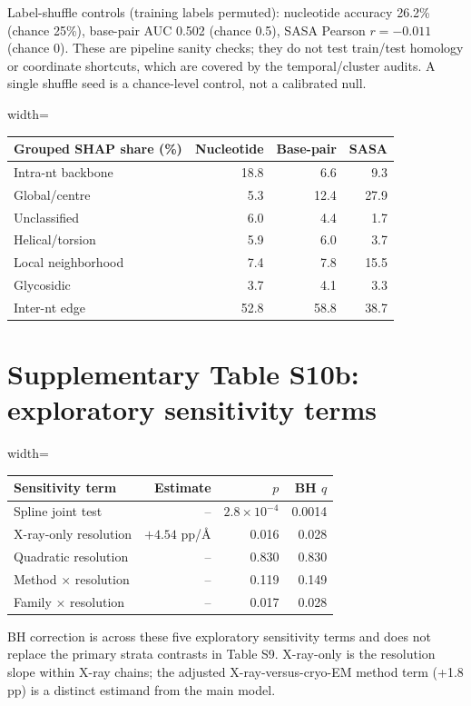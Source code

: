 \documentclass[pdflatex,sn-nature]{sn-jnl}
\begin{document}
Label-shuffle controls (training labels permuted): nucleotide accuracy 26.2\% (chance
25\%), base-pair AUC 0.502 (chance 0.5), SASA Pearson $r=-0.011$ (chance 0). These are pipeline sanity checks; they do not test train/test homology or coordinate shortcuts, which are covered by the temporal/cluster audits. A single shuffle seed is a chance-level control, not a calibrated null.

\begingroup\scriptsize
\begin{adjustbox}{width=\textwidth}
\begin{tabular}{lrrr}
\toprule
Grouped SHAP share (\%) & Nucleotide & Base-pair & SASA \\
\midrule
Intra-nt backbone & 18.8 & 6.6 & 9.3 \\
Global/centre & 5.3 & 12.4 & 27.9 \\
Unclassified & 6.0 & 4.4 & 1.7 \\
Helical/torsion & 5.9 & 6.0 & 3.7 \\
Local neighborhood & 7.4 & 7.8 & 15.5 \\
Glycosidic & 3.7 & 4.1 & 3.3 \\
Inter-nt edge & 52.8 & 58.8 & 38.7 \\
\bottomrule
\end{tabular}
\end{adjustbox}
\endgroup

\section*{Supplementary Table S10b: exploratory sensitivity terms}

\begingroup\scriptsize
\begin{adjustbox}{width=\textwidth}
\begin{tabular}{lrrr}
\toprule
Sensitivity term & Estimate & $p$ & BH $q$ \\
\midrule
Spline joint test & -- & $2.8\times10^{-4}$ & 0.0014 \\
X-ray-only resolution & $+4.54$ pp/\AA & 0.016 & 0.028 \\
Quadratic resolution & -- & 0.830 & 0.830 \\
Method $\times$ resolution & -- & 0.119 & 0.149 \\
Family $\times$ resolution & -- & 0.017 & 0.028 \\
\bottomrule
\end{tabular}
\end{adjustbox}
\endgroup

BH correction is across these five exploratory sensitivity terms and does not replace
the primary strata contrasts in Table S9. X-ray-only is the resolution slope within
X-ray chains; the adjusted X-ray-versus-cryo-EM method term (+1.8 pp) is a distinct
estimand from the main model.
\end{document}
